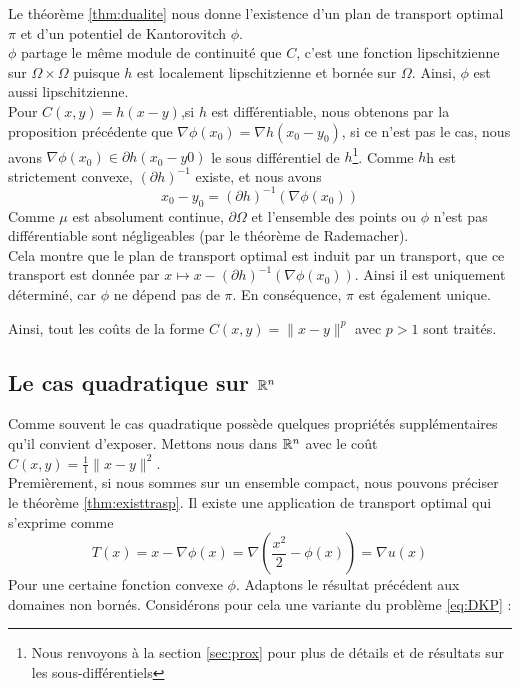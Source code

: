 \documentclass[a4paper,12pt]{article}
\begin{document}
\begin{preuve}
Le théorème \ref{thm:dualite} nous donne l'existence d'un plan de transport optimal $\pi$ et d'un potentiel de Kantorovitch $\phi$.\\

$\phi$ partage le même module de continuité que $C$, c'est une fonction lipschitzienne sur $\Omega\times\Omega$ puisque $h$ est localement lipschitzienne et bornée sur $\Omega$. Ainsi, $\phi$ est aussi lipschitzienne.\\

Pour $C(x,y) = h(x-y)$,si $h$ est différentiable, nous obtenons par la proposition précédente que $\nabla\phi (x_0)=\nabla h(x_0-y_0)$, si ce n'est pas le cas, nous avons $\nabla\phi(x_0)\in\partial h(x_0-y0)$ le sous différentiel de $h$\footnote{Nous renvoyons à la section \ref{sec:prox} pour plus de détails et de résultats sur les sous-différentiels}. Comme $h$h est strictement convexe, $(\partial h)^{-1}$ existe, et nous avons 
$$
x_0-y_0=(\partial h)^{-1}(\nabla\phi(x_0))
$$
Comme $\mu$ est absolument continue, $\partial\Omega$ et l'ensemble des points ou $\phi$ n'est pas différentiable sont négligeables (par le théorème de Rademacher). \\

Cela montre que le plan de transport optimal est induit par un transport, que ce transport est donnée par $x\mapsto x -(\partial h)^{-1}(\nabla\phi(x_0))$. Ainsi il est uniquement déterminé, car $\phi$ ne dépend pas de $\pi$. En conséquence, $\pi$ est également unique. 
\end{preuve}
Ainsi, tout les coûts de la forme $C(x,y) =\|x-y\|^p$ avec $p>1$ sont traités. 


\subsection{Le cas quadratique sur $\mathbb{R}^n$}
Comme souvent le cas quadratique possède quelques propriétés supplémentaires qu'il convient d'exposer. Mettons nous dans $\mathbb{R}^n $ avec le coût $C(x,y)=\frac{1}{1}\|x-y\|^2$.\\
Premièrement, si nous sommes sur un ensemble compact, nous pouvons préciser le théorème \eqref{thm:existtrasp}. Il existe une application de transport optimal qui s'exprime comme 
$$
T(x) = x -\nabla\phi(x) = \nabla\left(\frac{x^2}{2}-\phi(x)\right) = \nabla u(x)
$$
Pour une certaine fonction convexe $\phi$. Adaptons le résultat précédent aux domaines non bornés. Considérons pour cela une variante du problème \eqref{eq:DKP} : \\
\end{document}
